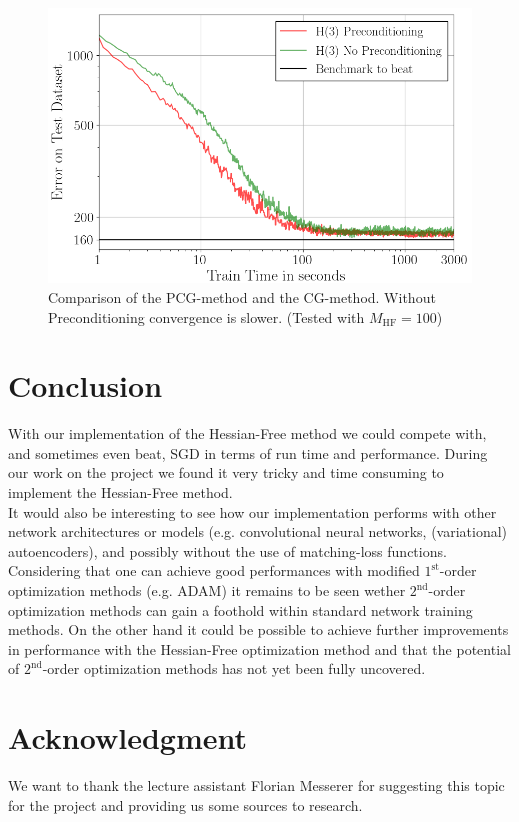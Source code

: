 \documentclass[conference]{IEEEtran}
\begin{document}
	
	\begin{figure}[htbp]
		\centerline{\includegraphics[scale=0.53]{Precond.png}}
		\caption{Comparison of the PCG-method and the CG-method. Without Preconditioning convergence is slower. (Tested with $M_{\mathrm{HF}}=100$)}
		\label{fig4}
	\end{figure}
	
	
	
	\section{Conclusion}
	\noindent
	With our implementation of the Hessian-Free method we could compete with, and sometimes even beat, SGD in terms of run time and performance.
	During our work on the project we found it very tricky and time consuming to implement the Hessian-Free method.\\
	It would also be interesting to see how our implementation performs with other network architectures or models (e.g. convolutional neural networks, (variational) autoencoders), and possibly without the use of matching-loss functions.\\
	Considering that one can achieve good performances with modified $1^{\text{st}}$-order optimization methods (e.g. ADAM) it remains to be seen wether $2^{\text{nd}}$-order optimization methods can gain a foothold within standard network training methods. On the other hand it could be possible to achieve further improvements in performance with the Hessian-Free optimization method and that the potential of $2^{\text{nd}}$-order optimization methods has not yet been fully uncovered.
	
	\section*{Acknowledgment}
	\noindent
	We want to thank the lecture assistant Florian Messerer for suggesting this topic for the project and providing us some sources to research.
	
\end{document}

